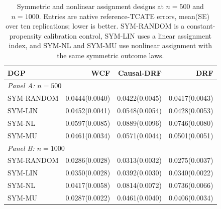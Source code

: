 \begin{table}[t]
\centering
\scriptsize
\setlength{\tabcolsep}{3pt}
\caption{Symmetric and nonlinear assignment designs at $n=500$ and $n=1000$. Entries are native reference-TCATE errors, mean(SE) over ten replications; lower is better. SYM-RANDOM is a constant-propensity calibration control, SYM-LIN uses a linear assignment index, and SYM-NL and SYM-MU use nonlinear assignment with the same symmetric outcome laws.}
\label{tab:sensitivity-assignment}
\begin{tabular}{lrrr}
\toprule
DGP & WCF & Causal-DRF & DRF \\
\midrule
\multicolumn{4}{l}{\textit{Panel A: $n=500$}} \\
\midrule
SYM-RANDOM & 0.0444(0.0040) & 0.0422(0.0045) & 0.0417(0.0043) \\
SYM-LIN & 0.0452(0.0041) & 0.0548(0.0054) & 0.0428(0.0053) \\
SYM-NL & 0.0597(0.0085) & 0.0889(0.0096) & 0.0746(0.0080) \\
SYM-MU & 0.0461(0.0034) & 0.0571(0.0044) & 0.0501(0.0051) \\
\multicolumn{4}{l}{\textit{Panel B: $n=1000$}} \\
\midrule
SYM-RANDOM & 0.0286(0.0028) & 0.0313(0.0032) & 0.0275(0.0037) \\
SYM-LIN & 0.0350(0.0028) & 0.0392(0.0030) & 0.0340(0.0022) \\
SYM-NL & 0.0417(0.0058) & 0.0814(0.0072) & 0.0736(0.0066) \\
SYM-MU & 0.0287(0.0022) & 0.0461(0.0040) & 0.0406(0.0034) \\
\bottomrule
\end{tabular}
\end{table}
